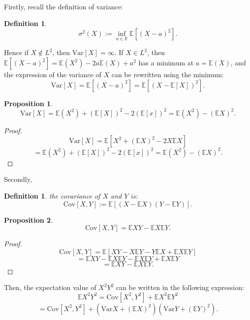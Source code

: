 \documentclass{article}
\theoremstyle{plain}
\theoremstyle{plain} %
\newtheorem{proposition}{Proposition}
\newtheorem{definition}[theorem]{Definition}
\theoremstyle{definition}  %
\theoremstyle{remark}  %
\theoremstyle{plain}
\begin{document}
Firstly, recall the definition of variance\cite{folland1999real}:
\begin{definition}
$$
\sigma^2(X):=\inf\limits_{a\in\mathbb{R}}\mathbb{E}\left[\left(X-a \right)^2 \right].
$$
\end{definition}
Hence if $X\notin L^2$, then $\text{Var}[X]=\infty$. If $X\in L^2$, then $\mathbb{E}\left[\left(X-a \right)^2 \right]=\mathbb{E}(X^2)-2a\mathbb{E}(X)+a^2$ has a minimum at $a=\mathbb{E}(X)$, and the expression of the variance of $X$ can be rewritten using the minimum:
$$
\text{Var}[X]=\mathbb{E}\left[\left(X-a \right)^2 \right]=\mathbb{E}\left[\left(X- \mathbb{E}[X]\right)^2 \right].
$$
\begin{proposition}
$$
\text{Var}[X]=\mathbb{E}(X^2)+(\mathbb{E}[X])^2-2(\mathbb{E}[x])^2=\mathbb{E}(X^2)-(\mathbb{E}X)^2.
$$
\end{proposition}
\begin{proof}
$$
\text{Var}[X]=\mathbb{E}\left[X^2+\left( \mathbb{E} X\right)^2 -2X\mathbb{E}X\right]
$$
$$
=\mathbb{E}(X^2)+(\mathbb{E}[X])^2-2(\mathbb{E}[x])^2=\mathbb{E}(X^2)-(\mathbb{E}X)^2.
$$
\end{proof}
Secondly, 
\begin{definition}
the covariance of $X$ and $Y$ is:
$$
\text{Cov}[X,Y]:=\mathbb{E}\left[(X-\mathbb{E} X)(Y-\mathbb{E} Y) \right].
$$
\end{definition}
\begin{proposition}
$$
\text{Cov}[X,Y]=\mathbb{E}XY-\mathbb{E}X\mathbb{E}Y.
$$
\end{proposition}

\begin{proof}
$$
\text{Cov}[X,Y]=\mathbb{E} \left[ XY -X\mathbb{E} Y -Y\mathbb{E}X +\mathbb{E}X \mathbb{E}Y\right]
$$
$$
=\mathbb{E}XY-\mathbb{E}X\mathbb{E}Y-\mathbb{E}X\mathbb{E}Y+\mathbb{E}X\mathbb{E}Y
$$
$$
=\mathbb{E}XY-\mathbb{E}X\mathbb{E}Y.
$$
\end{proof}

Then, the expectation value of $X^2Y^2$ can be written in the following expression:
$$
\mathbb{E}X^2Y^2=\text{Cov}[X^2,Y^2]+\mathbb{E}X^2\mathbb{E}Y^2
$$
$$
=\text{Cov}[X^2,Y^2]+(\text{Var}X+(\mathbb{E} X)^2)(\text{Var}Y+(\mathbb{E} Y)^2).
$$
\end{document}
